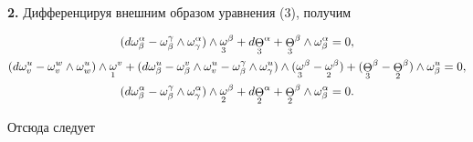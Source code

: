 {\bf 2.} Дифференцируя внешним образом уравнения (3), получим


\begin{gather*}  %


(d \omega^{\alpha}_{\beta} - \omega^{\gamma}_{\beta}\wedge


\omega^{\alpha}_{\gamma})\wedge{\crazy{\omega}{3}}^{\beta}+


d{\crazy{\Theta}{3}}^{\alpha}+{\crazy{\Theta}{3}}^{\beta}\wedge


\omega^{\alpha}_{\beta}=0,\\


%


(d {\omega}^{u}_{v} - {\omega}^{w}_{v}\wedge


{\omega}^{u}_{w})\wedge{\crazy{\omega}{1}}^{v}+ 


(d {\omega}^{u}_{\beta} - {\omega}^{v}_{\beta}\wedge


{\omega}^{u}_{v} - \omega^{\gamma}_{\beta}\wedge \omega^{u}_{\gamma})


\wedge({\crazy{\omega}{3}}^{\beta} - {\crazy{\omega}{2}}^{\beta})+


({\crazy{\Theta}{3}}^{\beta} - {\crazy{\Theta}{2}}^{\beta})


\wedge \omega^{u}_{\beta}=0,\\


%


(d \omega^{\alpha}_{\beta} - \omega^{\gamma}_{\beta}\wedge


\omega^{\alpha}_{\gamma})\wedge{\crazy{\omega}{2}}^{\beta}+


d{\crazy{\Theta}{2}}^{\alpha}+{\crazy{\Theta}{2}}^{\beta}\wedge


\omega^{\alpha}_{\beta}=0.


\end{gather*}


Отсюда следует


